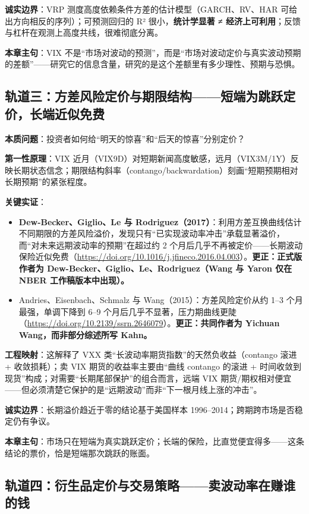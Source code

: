 \documentclass[11pt,a4paper]{article}
\begin{document}
\textbf{诚实边界}：VRP 测度高度依赖条件方差的估计模型（GARCH、RV、HAR 可给出方向相反的序列）；可预测回归的 R² 很小，\textbf{统计学显著 ≠ 经济上可利用}；反馈与杠杆在观测上高度共线，很难彻底分离。

\textbf{本章主句}：VIX 不是“市场对波动的预测”，而是“市场对波动定价与真实波动预期的差额”——研究它的信息含量，研究的是这个差额里有多少理性、预期与恐惧。

\subsection{轨道三：方差风险定价与期限结构——短端为跳跃定价，长端近似免费}

\textbf{本质问题}：投资者如何给“明天的惊喜”和“后天的惊喜”分别定价？

\textbf{第一性原理}：VIX 近月（VIX9D）对短期新闻高度敏感，远月（VIX3M/1Y）反映长期状态信念；期限结构斜率（contango/backwardation）刻画“短期预期相对长期预期”的紧张程度。

\textbf{关键实证}：
\begin{itemize}[leftmargin=2.2em]
  \item \textbf{Dew-Becker、Giglio、Le 与 Rodriguez（2017）}：利用方差互换曲线估计不同期限的方差风险溢价，发现只有“已实现波动率冲击”承载显著溢价，而“对未来远期波动率的预期”在超过约 2 个月后几乎不再被定价——长期波动保险近似免费（\url{https://doi.org/10.1016/j.jfineco.2016.04.003}）。\textcolor{red!70!black}{\textbf{更正：正式版作者为 Dew-Becker、Giglio、Le、Rodriguez（Wang 与 Yaron 仅在 NBER 工作稿版本中出现）。}}
  \item Andries、Eisenbach、Schmalz 与 Wang（2015）：方差风险定价从约 1--3 个月最强，单调下降到 6--9 个月后几乎不显著，压力期曲线更陡（\url{https://doi.org/10.2139/ssrn.2646079}）。\textcolor{red!70!black}{\textbf{更正：共同作者为 Yichuan Wang，而非部分综述所写 Kahn。}}
\end{itemize}

\textbf{工程映射}：这解释了 VXX 类“长波动率期货指数”的天然负收益（contango 滚进 + 收敛损耗）；卖 VIX 期货的收益率主要由“曲线 contango 的滚进 + 时间收敛到现货”构成；对需要“长期尾部保护”的组合而言，远端 VIX 期货/期权相对便宜——但必须清楚它保护的是“远期波动”而非“下一根月线上涨的冲击”。

\textbf{诚实边界}：长期溢价趋近于零的结论基于美国样本 1996--2014；跨期跨市场是否稳定仍有争议。

\textbf{本章主句}：市场只在短端为真实跳跃定价；长端的保险，比直觉便宜得多——这条结论的票价，恰是短端那次跳跃的账面。

\subsection{轨道四：衍生品定价与交易策略——卖波动率在赚谁的钱}
\end{document}
